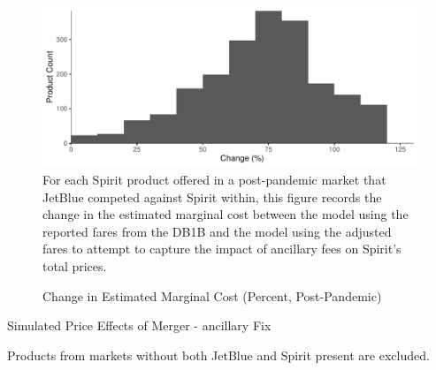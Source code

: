 \documentclass{article}
\begin{document}
    \begin{figure}
        \caption{Change in Estimated Marginal Cost (Percent, Post-Pandemic)}
        \label{tab:Fee_Fix_postpandemic_MC_PercentChange}
        \includegraphics[width = \linewidth]{Fee_Fix_MC_Graph_Percent_JBMarket.pdf}
        \footnotesize{For each Spirit product offered in a post-pandemic market that JetBlue competed against Spirit within, this figure records the change in the estimated marginal cost between the model using the reported fares from the DB1B and the model using the adjusted fares to attempt to capture the impact of ancillary fees on Spirit's total prices.}
    \end{figure}




    \begin{table}
        \caption{Simulated Price Effects of Merger - ancillary Fix}
        \label{tab:Simulation_Price_Aux_Scale}
                \vspace{-15mm}
        \begin{center}
        
        \end{center}
        \vspace{-5mm}
        \footnotesize{Products from markets without both JetBlue and Spirit present are excluded.}

     \end{table}
\end{document}
